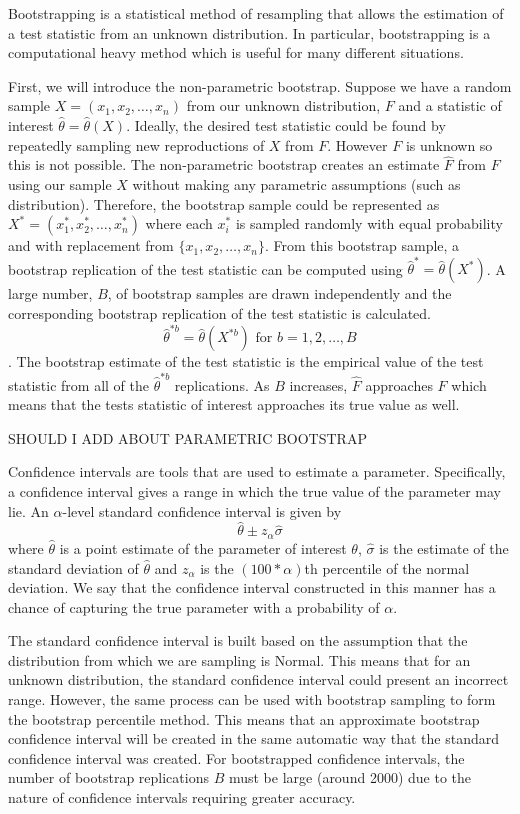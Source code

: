 \documentclass[12pt]{article}
\begin{document}
Bootstrapping is a statistical method of resampling that allows the
estimation of a test statistic from an unknown distribution. In
particular, bootstrapping is a computational heavy method which is
useful for many different situations.

First, we will introduce the non-parametric bootstrap. Suppose we have a
random sample \(X = (x_1,x_2,\dots,x_n)\) from our unknown distribution,
\(F\) and a statistic of interest \(\hat{\theta} = \hat{\theta}(X)\).
Ideally, the desired test statistic could be found by repeatedly
sampling new reproductions of \(X\) from \(F\). However \(F\) is unknown
so this is not possible. The non-parametric bootstrap creates an
estimate \(\hat{F}\) from \(F\) using our sample \(X\) without making
any parametric assumptions (such as distribution). Therefore, the
bootstrap sample could be represented as
\(X^* = (x^*_1, x^*_2, \dots, x^*_n)\) where each \(x^*_i\) is sampled
randomly with equal probability and with replacement from
\(\{x_1,x_2,\dots,x_n\}\). From this bootstrap sample, a bootstrap
replication of the test statistic can be computed using
\(\hat{\theta}^* = \hat{\theta}(X^*)\). A large number, \(B\), of
bootstrap samples are drawn independently and the corresponding
bootstrap replication of the test statistic is calculated.
\[\hat{\theta}^{*b} = \hat{\theta}(X^{*b}) \text{ for } b = 1,2, \dots, B\].
The bootstrap estimate of the test statistic is the empirical value of
the test statistic from all of the \(\hat{\theta}^{*b}\) replications.
As \(B\) increases, \(\hat{F}\) approaches \(F\) which means that the
tests statistic of interest approaches its true value as well.

SHOULD I ADD ABOUT PARAMETRIC BOOTSTRAP

Confidence intervals are tools that are used to estimate a parameter.
Specifically, a confidence interval gives a range in which the true
value of the parameter may lie. An \(\alpha\)-level standard confidence
interval is given by \[\hat{\theta} \pm z_{\alpha}\hat{\sigma}\] where
\(\hat{\theta}\) is a point estimate of the parameter of interest
\(\theta\), \(\hat{\sigma}\) is the estimate of the standard deviation
of \(\hat{\theta}\) and \(z_{\alpha}\) is the \((100 *\alpha)\)th
percentile of the normal deviation. We say that the confidence interval
constructed in this manner has a chance of capturing the true parameter
with a probability of \(\alpha\).

The standard confidence interval is built based on the assumption that
the distribution from which we are sampling is Normal. This means that
for an unknown distribution, the standard confidence interval could
present an incorrect range. However, the same process can be used with
bootstrap sampling to form the bootstrap percentile method. This means
that an approximate bootstrap confidence interval will be created in the
same automatic way that the standard confidence interval was created.
For bootstrapped confidence intervals, the number of bootstrap
replications \(B\) must be large (around 2000) due to the nature of
confidence intervals requiring greater accuracy.
\end{document}
